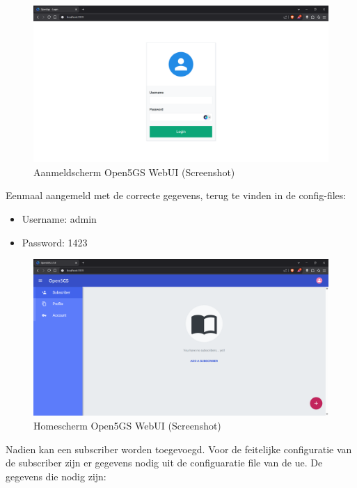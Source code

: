\begin{figure}[H]
    \includegraphics[width=\linewidth]{../graphics/POC-WebUI-Login.png}
    \caption{Aanmeldscherm Open5GS WebUI (Screenshot)}
    \label{fig:Aanmeld WebUI}
\end{figure}

Eenmaal aangemeld met de correcte gegevens, terug te vinden in de config-files:

\begin{itemize}
    \item Username: admin
    \item Password: 1423
\end{itemize}

\begin{figure}[H]
    \includegraphics[width=\linewidth]{../graphics/POC-WebUI-home.png}
    \caption{Homescherm Open5GS WebUI (Screenshot)}
    \label{fig:Home WebUI}
\end{figure}

Nadien kan een  subscriber worden toegevoegd.
Voor de feitelijke configuratie van de subscriber zijn er gegevens nodig uit de configuaratie file van de \gls{ue}. De gegevens die nodig zijn:

